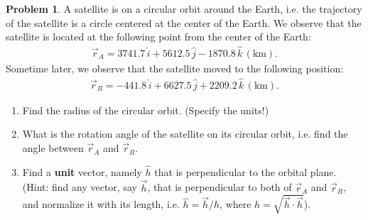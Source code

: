 \documentclass[10pt]{article}
\theoremstyle{definition}
\newtheorem{prob}{Problem}[section]
\newenvironment{subprob}%
{\renewcommand{\theenumi}{\alph{enumi}}\renewcommand{\labelenumi}{(\theenumi)}\begin{enumerate}}%
{\end{enumerate}}%
\begin{document}
\begin{prob}
A satellite is on a circular orbit around the Earth, i.e. the trajectory of the satellite is a circle centered at the center of the Earth. We observe that the satellite is located at the following point from the center of the Earth:
\begin{align*}
\vec r_A = 3741.7\,\hat i +    5612.5\, \hat j  -1870.8\,\hat k\,(\mathrm{km}).
\end{align*}
Sometime later, we observe that the satellite moved to the following position:
\begin{align*}
\vec r_B = -441.8\,\hat i +    6627.5\, \hat j +2209.2\,\hat k\,(\mathrm{km}).
\end{align*}

\begin{subprob}
\item Find the radius of the circular orbit. (Specify the units!)
\item What is the rotation angle of the satellite on its circular orbit, i.e. find the angle between $\vec r_A$ and $\vec r_B$.
\item Find a \textbf{unit} vector, namely $\hat h$ that is perpendicular to the orbital plane. (Hint: find any vector, say $\vec h$, that is perpendicular to both of $\vec r_A$ and $\vec r_B$, and normalize it with its length, i.e. $\hat h = \vec h / h$, where $h=\sqrt{\vec h \cdot \vec h}$).
\end{subprob}

\end{prob}
\end{document}
